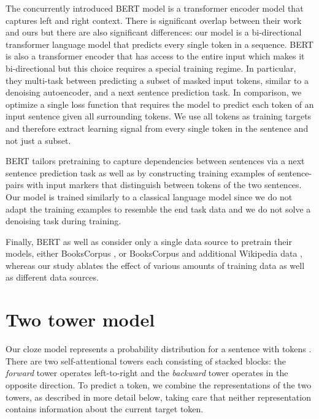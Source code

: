 \documentclass[11pt,a4paper]{article}
\begin{document}
The concurrently introduced BERT model \citep{devlin2018bert} is a transformer encoder model that captures left and right context.
There is significant overlap between their work and ours but there are also significant differences: our model is a bi-directional transformer language model that predicts every single token in a sequence.
BERT is also a transformer encoder that has access to the entire input which makes it bi-directional but this choice requires a special training regime. 
In particular, they multi-task between predicting a subset of masked input tokens, similar to a denoising autoencoder, and a next sentence prediction task.
In comparison, we optimize a single loss function that requires the model to predict each token of an input sentence given all surrounding tokens.
We use all tokens as training targets and therefore extract learning signal from every single token in the sentence and not just a subset.

BERT tailors pretraining to capture dependencies between sentences via a next sentence prediction task as well as by constructing training examples of sentence-pairs with input markers that distinguish between tokens of the two sentences. 
Our model is trained similarly to a classical language model since we do not adapt the training examples to resemble the end task data and we do not solve a denoising task during training.

Finally, BERT as well as \citet{radford2018unsup} consider only a single data source to pretrain their models, either BooksCorpus \citep{radford2018unsup}, or BooksCorpus and additional Wikipedia data \citep{devlin2018bert}, whereas our study ablates the effect of various amounts of training data as well as different data sources.




\section{Two tower model}

Our cloze model represents a probability distribution   for a sentence with  tokens .
There are two self-attentional towers each consisting of  stacked blocks:
the \emph{forward} tower operates left-to-right and the \emph{backward} tower operates in the opposite direction.
To predict a token, we combine the representations of the two towers, as described in more detail below, taking care that neither representation contains information about the current target token.
\end{document}

